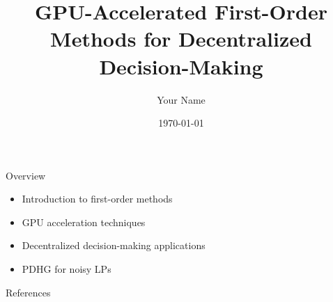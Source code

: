 \documentclass{beamer}
\title{GPU-Accelerated First-Order Methods for Decentralized Decision-Making}
\author{Your Name}
\date{\today}
\begin{document}
\begin{frame}
\titlepage
\end{frame}

\begin{frame}{Overview}
\begin{itemize}
\item Introduction to first-order methods
\item GPU acceleration techniques
\item Decentralized decision-making applications
\item PDHG for noisy LPs
\end{itemize}
\end{frame}

\begin{frame}{References}


\end{frame}
\end{document}
